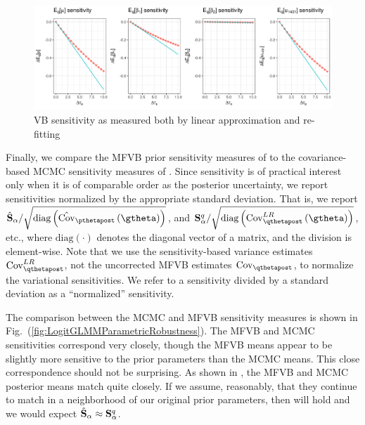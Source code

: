 \documentclass{article}\usepackage[]{graphicx}\usepackage[]{color}
\newenvironment{knitrout}{}{} %
\theoremstyle{plain}
\theoremstyle{definition}
\theoremstyle{plain}
\theoremstyle{plain}
\theoremstyle{plain}
\theoremstyle{plain}
\newcommand{\fig}[1]{Fig.~(\ref{fig:#1})}
\begin{document}
\begin{knitrout}
\color{fgcolor}\begin{figure}[!h]

{\centering \includegraphics[width=0.98\linewidth,height=0.343\linewidth]{figure/LogitGLMMRefit-1} 

}

\caption[VB sensitivity as measured both by linear approximation and re-fitting]{VB sensitivity as measured both by linear approximation and re-fitting}\label{fig:LogitGLMMRefit}
\end{figure}


\end{knitrout}
Finally, we compare the MFVB prior sensitivity measures of 
to the covariance-based MCMC sensitivity measures of .
Since sensitivity is of practical interest only when it is of comparable
order as the posterior uncertainty, we report sensitivities normalized
by the appropriate standard deviation. That is, we report $\psenshat/\sqrt{\textrm{diag}\left(\hat{\cov}_{\pthetapost}\left(\gtheta\right)\right)}$,
and $\qsens/\sqrt{\textrm{diag}\left(\lrvbcov\left(\gtheta\right)\right)}$,
etc., where $\textrm{diag}\left(\cdot\right)$ denotes the diagonal
vector of a matrix, and the division is element-wise. Note that we
use the sensitivity-based variance estimates $\lrvbcov$, not the
uncorrected MFVB estimates $\cov_{\qthetapost}$, to normalize the
variational sensitivities. We refer to a sensitivity divided by a
standard deviation as a ``normalized'' sensitivity. 

The comparison between the MCMC and MFVB sensitivity measures is shown
in \fig{LogitGLMMParametricRobustness}. The MFVB and MCMC sensitivities
correspond very closely, though the MFVB means appear to be slightly
more sensitive to the prior parameters than the MCMC means. This close
correspondence should not be surprising. As shown in ,
the MFVB and MCMC posterior means match quite closely. If we assume,
reasonably, that they continue to match in a neighborhood of our original
prior parameters, then  will hold and
we would expect $\hat{\mathbf{S}}_{\alpha}\approx\mathbf{S}_{\alpha}^{q}$.
\end{document}
